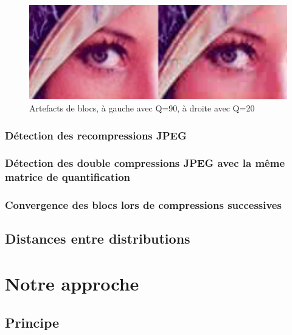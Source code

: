 \documentclass[utf8]{stageM2R} %
\begin{document}
\begin{figure}[H]
  \begin{center}
    \includegraphics[width=120mm]{images/eyes.png}
    \caption{Artefacts de blocs, à gauche avec Q=90, à droite avec Q=20}
    \label{fig:blocs_artefacts}
  \end{center}
\end{figure}


\subsection{Détection des recompressions JPEG}
\cite{feng2010jpeg}

\subsection{Détection des double compressions JPEG avec la même matrice de quantification}
\cite{huang2010detecting}

\subsection{Convergence des blocs lors de compressions successives}
\cite{lai2013block}

\section{Distances entre distributions}
\cite{oikawa2015distances}

\chapter{Notre approche}
\label{chap:notre_approche}
\section{Principe}

\end{document}
